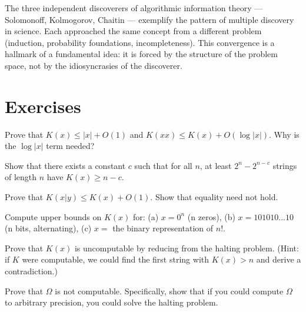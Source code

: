 The three independent discoverers of algorithmic information theory --- Solomonoff, Kolmogorov, Chaitin --- exemplify the pattern of multiple discovery in science. Each approached the same concept from a different problem (induction, probability foundations, incompleteness). This convergence is a hallmark of a fundamental idea: it is forced by the structure of the problem space, not by the idiosyncrasies of the discoverer.

\section{Exercises}
\label{sec:kolmogorov:exercises}

\begin{exercise}[Basic]
Prove that $K(x) \le |x| + O(1)$ and $K(xx) \le K(x) + O(\log |x|)$. Why is the $\log |x|$ term needed?
\end{exercise}

\begin{exercise}[Basic]
Show that there exists a constant $c$ such that for all $n$, at least $2^n - 2^{n-c}$ strings of length $n$ have $K(x) \ge n - c$.
\end{exercise}

\begin{exercise}[Basic]
Prove that $K(x|y) \le K(x) + O(1)$. Show that equality need not hold.
\end{exercise}

\begin{exercise}[Basic]
Compute upper bounds on $K(x)$ for: (a) $x = 0^n$ (n zeros), (b) $x = 101010\ldots10$ (n bits, alternating), (c) $x =$ the binary representation of $n!$.
\end{exercise}

\begin{exercise}[Intermediate]
Prove that $K(x)$ is uncomputable by reducing from the halting problem. (Hint: if $K$ were computable, we could find the first string with $K(x) > n$ and derive a contradiction.)
\end{exercise}

\begin{exercise}[Intermediate]
Prove that $\Omega$ is not computable. Specifically, show that if you could compute $\Omega$ to arbitrary precision, you could solve the halting problem.
\end{exercise}

